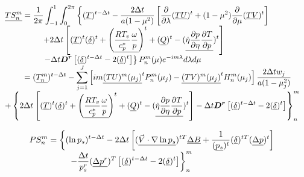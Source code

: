 \documentclass[12pt,a4paper]{book}
\begin{document}
	\begin{equation}
	\begin{array}{l}
	\displaystyle 
	\underline{TS_n^m} =  \frac{1}{2\pi} \int_{-1}^{1} \int_{0}^{2 \pi} \left\lbrace
		(\underline{T})^{t-\Delta t} 
			- \frac{2\Delta t }{a(1-\mu^2)} \left[ \frac{\partial}{\partial \lambda} (\underline{T} \underline{U})^t 
			+ (1-\mu^2) \frac{\partial}{\partial \mu} (\underline{T} \underline{V})^t \right] \right. \\
			\displaystyle 
			\hspace{4 pc} + 2\Delta t \left[ (\underline{T})^t (\underline{\delta})^t + \left(\underline{\frac{RT_v}{c_p^*} \frac{\omega}{p}} \right)^t
			+ (\underline{Q})^t - (\underline{\dot{\eta} \frac{\partial p}{\partial \eta} \frac{\partial T}{\partial p}})^t \right] \\
			\displaystyle  \left.
			\hspace{4 pc} - \Delta t \boldsymbol{D^r} \left[(\underline{\delta})^{t-\Delta t}  - 2(\underline{\delta})^t \right] \right\rbrace
	P_n^m(\mu) e^{-im\lambda} d\lambda d\mu \\
	\displaystyle 
	\hspace{2 pc} = (\underline{T_n^m})^{t-\Delta t}  - \sum_{j=1}^{J} \left[ 
		 im \underline{(TU)^m(\mu_j)}^t P_n^m(\mu_j) 
		-   \underline{(TV)^m(\mu_j)}^t H_n^m(\mu_j) 
		\right] \frac{2 \Delta t w_j}{a(1-\mu_j^2)} \\
		\displaystyle 
		+ \left\lbrace 2\Delta t \left[ (\underline{T})^t (\underline{\delta})^t + \left(\underline{\frac{RT_v}{c_p^*} \frac{\omega}{p}} \right)^t
		+ (\underline{Q})^t - (\underline{\dot{\eta} \frac{\partial p}{\partial \eta} \frac{\partial T}{\partial p}})^t \right] 
		- \Delta t \boldsymbol{D^r} \left[(\underline{\delta})^{t-\Delta t}  - 2(\underline{\delta})^t \right] \right\rbrace_n^m
	\end{array} 
	\end{equation}
	
	\begin{equation}
	\begin{array}{l}
	\displaystyle 
	PS_n^m = \left\lbrace (\ln p_s)^{t-\Delta t} 
	\displaystyle 
	- 2\Delta t \left[ (\underline{\vec{V} \cdot \nabla \ln p_s})^{tT} \underline{\Delta B} 
	+ \frac{1}{(\underline{p_s})^t} (\underline{\delta})^{tT} (\underline{\Delta p})^t  \right] \right. \\
	\displaystyle \left.
	\hspace{4 pc} - \frac{\Delta t}{p_s^r} (\underline{\Delta p^r})^T \left[(\underline{\delta})^{t-\Delta t} - 2(\underline{\delta})^t \right] \right\rbrace _n^m \\

	\end{array} 
	\end{equation}	
	
\end{document}
